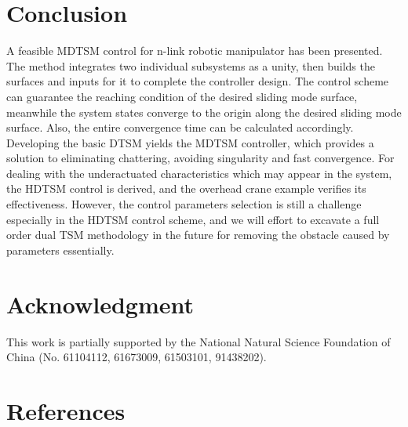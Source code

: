 \documentclass[3p]{elsarticle}
\theoremstyle{plain}
\theoremstyle{remark}
\begin{document}
\section{Conclusion}\label{sec:5}
A feasible MDTSM control for n-link robotic manipulator has been presented. The method integrates two individual subsystems as a unity, then builds the surfaces and inputs for it to complete the controller design. The control scheme can guarantee the reaching condition of the desired sliding mode  surface, meanwhile the system states converge to the origin along the desired sliding mode  surface. Also, the entire convergence time can be calculated accordingly. Developing the basic DTSM yields the MDTSM controller, which provides a solution to eliminating chattering, avoiding singularity and fast convergence. For dealing with the underactuated characteristics which may appear in the system, the HDTSM control is derived, and the overhead crane example verifies its effectiveness. However, the control parameters selection is still a challenge especially in the HDTSM control scheme, and we will effort to excavate a full order dual TSM methodology in the future for removing the obstacle caused by parameters essentially.
\section{Acknowledgment}
This work is partially supported by the National Natural Science Foundation of China (No. 61104112, 61673009, 61503101, 91438202).
\section{References}


\end{document}
